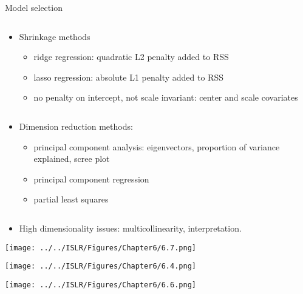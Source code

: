 \documentclass[10pt,ignorenonframetext,]{beamer}
\providecommand{\tightlist}{%
  \setlength{\itemsep}{0pt}\setlength{\parskip}{0pt}}
\begin{document}
\begin{frame}

\begin{block}{Model selection}

\(~\)

\begin{itemize}
\item
  Shrinkage methods

  \begin{itemize}
  \tightlist
  \item
    ridge regression: quadratic L2 penalty added to RSS
  \item
    lasso regression: absolute L1 penalty added to RSS
  \item
    no penalty on intercept, not scale invariant: center and scale
    covariates
  \end{itemize}

  \(~\)
\item
  Dimension reduction methods:

  \begin{itemize}
  \tightlist
  \item
    principal component analysis: eigenvectors, proportion of variance
    explained, scree plot
  \item
    principal component regression
  \item
    partial least squares
  \end{itemize}

  \(~\)
\item
  High dimensionality issues: multicollinearity, interpretation.
\end{itemize}

\end{block}

\end{frame}

\begin{frame}

\texttt{[image: ../../ISLR/Figures/Chapter6/6.7.png]}

\end{frame}

\begin{frame}

\texttt{[image: ../../ISLR/Figures/Chapter6/6.4.png]}

\end{frame}

\begin{frame}

\texttt{[image: ../../ISLR/Figures/Chapter6/6.6.png]}

\end{frame}
\end{document}
